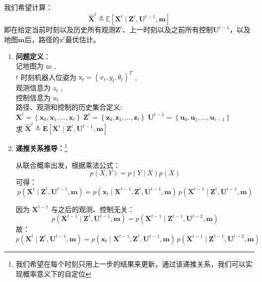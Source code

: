 \documentclass[../main.tex]{subfiles}
\begin{document}
\begin{enumerate}
            我们希望计算：
        \[
        \widehat{\mathbf{X}}^{t} \triangleq \mathbb{E}\left[ \mathbf{X}^{t} \mid \mathbf{Z}^{t}, \mathbf{U}^{t-1}, \mathbf{m} \right]
        \]
        即在给定当前时刻以及历史所有观测$\mathbf{Z}^{t}$、上一时刻以及之前所有控制$\mathbf{U}^{t-1}$，以及地图$\mathbf{m}$后，路径的$\mathrm{x}^t$最优估计。\label{prove}
        {\small\kaishu 
        \begin{enumerate}
        \item \textbf{问题定义}：\\
        记地图为 \( \mathrm{m} \) ,\\
\( t \) 时刻机器人位姿为 \( \mathrm{x}_{t} = {\left( {x}_{t},{y}_{t},{\theta }_{t}\right) }^{T} \) ,\\观测信息为 \( {z}_{t} \) ,\\控制信息为 \( {u}_{t} \)\\路径、观测和控制的历史集合定义:
\( {\mathbf{X}}^{t} = \left\{  {{\mathbf{x}}_{0},{\mathbf{x}}_{1},\ldots ,{\mathbf{x}}_{t}}\right\}  \;{\mathbf{Z}}^{t} = \left\{  {{\mathbf{z}}_{0},{\mathbf{z}}_{1},\ldots ,{\mathbf{z}}_{t}}\right\}  \;{\mathbf{U}}^{t - 1} = \left\{  {{\mathbf{u}}_{0},{\mathbf{u}}_{1},\ldots ,{\mathbf{u}}_{t - 1}}\right\} \)
\\求 \( {\widehat{\mathbf{X}}}^{t} \triangleq  \mathbf{E}\left\lbrack  {{\mathbf{X}}^{t} \mid  {\mathbf{Z}}^{t},{\mathbf{U}}^{t - 1},\mathbf{m}}\right\rbrack \)
        \item \textbf{递推关系推导：}\footnote{我们希望在每个时刻只用上一步的结果来更新，通过该递推关系，我们可以实现概率意义下的自定位}
        
        从联合概率出发，根据乘法公式：
        \[
        p(X,Y) = p(Y \mid X) p(X)
        \]
        可得：
        \[
        p(\mathbf{X}^{t} \mid \mathbf{Z}^{t}, \mathbf{U}^{t-1}, \mathbf{m})
        = p(\mathbf{x}_t \mid \mathbf{X}^{t-1}, \mathbf{Z}^{t}, \mathbf{U}^{t-1}, \mathbf{m})
        \, p(\mathbf{X}^{t-1} \mid \mathbf{Z}^{t}, \mathbf{U}^{t-1}, \mathbf{m})
        \]

        因为 \( \mathbf{X}^{t-1} \) 与之后的观测、控制无关：
        \[
        p(\mathbf{X}^{t-1} \mid \mathbf{Z}^{t}, \mathbf{U}^{t-1}, \mathbf{m})
        = p(\mathbf{X}^{t-1} \mid \mathbf{Z}^{t-1}, \mathbf{U}^{t-2}, \mathbf{m})
        \]
        故：
        \[
        p(\mathbf{X}^{t} \mid \mathbf{Z}^{t}, \mathbf{U}^{t-1}, \mathbf{m})
        = p(\mathbf{x}_t \mid \mathbf{X}^{t-1}, \mathbf{Z}^{t}, \mathbf{U}^{t-1}, \mathbf{m})
        \, p(\mathbf{X}^{t-1} \mid \mathbf{Z}^{t-1}, \mathbf{U}^{t-2}, \mathbf{m})
        \]
        

\end{enumerate}}
\end{enumerate}
\end{document}
